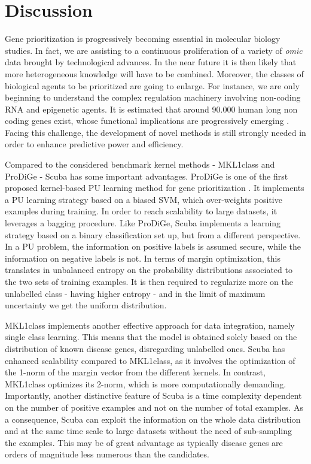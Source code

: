 \documentclass[twocolumn]{bmcart}%
\begin{document}
\section*{Discussion}
Gene prioritization is progressively becoming essential in molecular biology studies. In fact, we are assisting to a continuous proliferation of a variety of \emph{omic} data brought by technological advances. In the near future it is then likely that more heterogeneous knowledge will have to be combined. Moreover, the classes of biological agents to be prioritized are going to enlarge. For instance, we are only beginning to understand the complex regulation machinery involving non-coding RNA and epigenetic agents. It is estimated that around 90.000 human long non coding genes exist, whose functional implications are progressively emerging \cite{noncode}. Facing this challenge, the development of novel methods is still strongly needed in order to enhance predictive power and efficiency. 

Compared to the considered benchmark kernel methods - MKL1class and ProDiGe - Scuba has some important advantages. ProDiGe is one of the first proposed kernel-based PU learning method for gene prioritization \cite{prodige}. It implements a PU learning strategy based on a biased SVM, which over-weights positive examples during training. In order to reach scalability to large datasets, it leverages a bagging procedure. Like ProDiGe, Scuba implements a learning strategy based on a binary classification set up, but from a different perspective. In a PU problem, the information on positive labels is assumed secure, while the information on negative labels is not. In terms of margin optimization, this translates in unbalanced entropy on the probability distributions associated to the two sets of training examples. It is then required to regularize more on the unlabelled class - having higher entropy - and in the limit of maximum uncertainty we get the uniform distribution.

MKL1class implements another effective approach for data integration, namely single class learning. This means that the model is obtained solely based on the distribution of known disease genes, disregarding unlabelled ones. Scuba has enhanced scalability compared to MKL1class, as it involves the optimization of the 1-norm of the margin vector from the different kernels. In contrast, MKL1class optimizes its 2-norm, which is more computationally demanding. Importantly, another distinctive feature of Scuba is a time complexity dependent on the number of positive examples and not on the number of total examples. As a consequence, Scuba can exploit the information on the whole data distribution and at the same time scale to large datasets without the need of sub-sampling the examples. This may be of great advantage as typically disease genes are orders of magnitude less numerous than the candidates.
\end{document}
